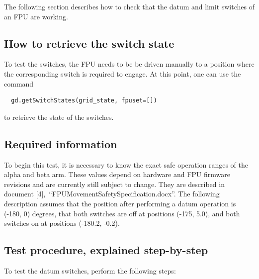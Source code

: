 \documentclass[11pt,a4paper]{scrartcl}
\begin{document}
The following section describes how to check that the datum and limit
switches of an FPU are working.

\subsection{How to retrieve the switch state}


To test the switches, the FPU needs to be be driven manually to a
position where the corresponding switch is required to engage. At this
point, one can use the command

\begin{verbatim}
  gd.getSwitchStates(grid_state, fpuset=[])
\end{verbatim}

to retrieve the state of the switches.


\subsection{Required information}

To begin this test, it is necessary to know the exact safe operation
ranges of the alpha and beta arm. These values depend on hardware and
FPU firmware revisions and are currently still subject to change.
They are described in document
[4],~``FPUMovementSafetySpecification.docx''.  The following
description assumes that the position after performing a datum
operation is (-180\degree, 0\degree) degrees, that both switches are off at
positions (-175\degree, 5.0\degree), and both switches on at positions (-180.2\degree,
-0.2\degree).

\subsection{Test procedure, explained step-by-step}
To test the datum switches, perform the following steps:
\end{document}
